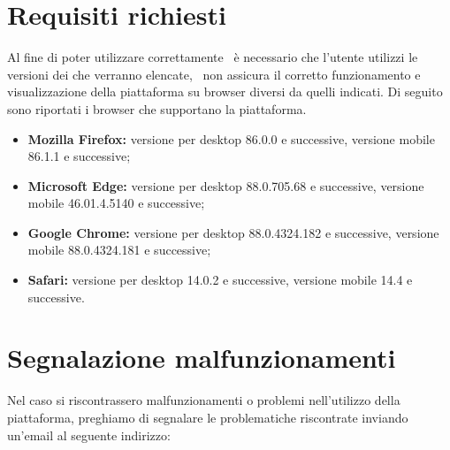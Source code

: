 \section{Requisiti richiesti}\label{Requisiti}
Al fine di poter utilizzare correttamente \NomeProgetto\ è necessario che l'utente utilizzi le versioni dei  che verranno elencate, \Gruppo\ non assicura il corretto funzionamento e visualizzazione della piattaforma su browser diversi da quelli indicati.
Di seguito sono riportati i browser che supportano la piattaforma.
\begin{itemize}
	\item \textbf{Mozilla Firefox:} versione per desktop 86.0.0 e successive, versione mobile 86.1.1 e successive;
	\item \textbf{Microsoft Edge:} versione per desktop 88.0.705.68 e successive, versione mobile 46.01.4.5140 e successive;
	\item \textbf{Google Chrome:} versione per desktop 88.0.4324.182 e successive, versione mobile 88.0.4324.181 e successive;
	\item \textbf{Safari:} versione per desktop 14.0.2 e successive, versione mobile 14.4 e successive.
\end{itemize}
\section{Segnalazione malfunzionamenti}
Nel caso si riscontrassero malfunzionamenti o problemi nell'utilizzo della piattaforma, preghiamo di segnalare le problematiche riscontrate inviando un'email al seguente indirizzo:
\begin{center}
	\href{mailto:\Mail}{\Mail}
\end{center}
